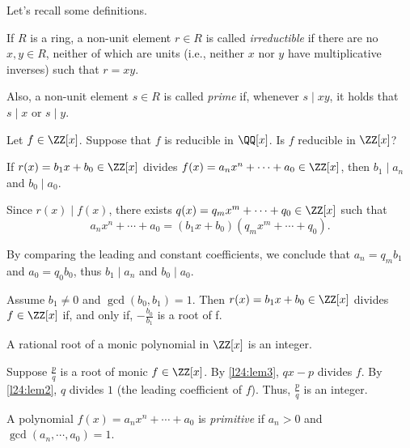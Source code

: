 
Let's recall some definitions.

\begin{defn}
	If $R$ is a ring, a non-unit element $r \in R$ is called \emph{irreductible} if there are no $x, y \in R$, neither of which are units (i.e., neither $x$ nor $y$ have multiplicative inverses) such that $r = xy$.

	Also, a non-unit element $s \in R$ is called \emph{prime} if, whenever $s \mid xy$, it holds that $s \mid x$ or $s \mid y$.
\end{defn}

\begin{prob}
	Let $f \in \ZZ[x]$. Suppose that $f$ is reducible in $\QQ[x]$. Is $f$ reducible in $\ZZ[x]$?
\end{prob}

\begin{lem}\label{l24:lem2}
	If $r(x) = b_1x + b_0 \in \ZZ[x]$ divides $f(x) = a_nx^n + \cdots + a_0 \in \ZZ[x]$, then $b_1 \mid a_n$ and $b_0 \mid a_0$.
\end{lem}

\begin{dem}
	Since $r(x) \mid f(x)$, there exists $q(x) = q_mx^m + \cdots + q_0 \in \ZZ[x]$ such that \[a_nx^n + \cdots + a_0 = (b_1x + b_0)(q_mx^m + \cdots + q_0).\] 

	By comparing the leading and constant coefficients, we conclude that $a_n = q_mb_1$ and $a_0 = q_0b_0$, thus $b_1 \mid a_n$ and $b_0 \mid a_0$.
\end{dem}

\begin{lem}\label{l24:lem3}
	Assume $b_1 \neq 0$ and $\gcd(b_0, b_1) = 1$. Then $r(x) = b_1x + b_0 \in \ZZ[x]$ divides $f \in \ZZ[x]$ if, and only if, $-\frac{b_0}{b_1}$ is a root of f.
\end{lem}

\begin{lem}
	A rational root of a monic polynomial in $\ZZ[x]$ is an integer.
\end{lem}
\begin{dem}
	Suppose $\frac{p}{q}$ is a root of monic $f \in \ZZ[x]$. By \cref{l24:lem3}, $qx - p$ divides $f$. By \cref{l24:lem2}, $q$ divides $1$ (the leading coefficient of $f$). Thus, $\frac{p}{q}$ is an integer.
\end{dem}

\begin{defn}
	A polynomial $f(x) = a_nx^n + \cdots + a_0$ is \emph{primitive} if $a_n > 0$ and $\gcd(a_n, \cdots, a_0) = 1$.
\end{defn}

